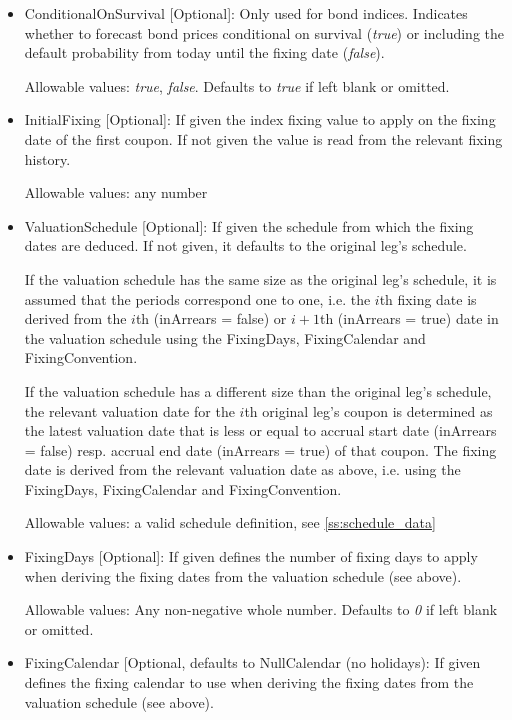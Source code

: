 \begin{itemize}
\begin{itemize}
\item ConditionalOnSurvival [Optional]: Only used for bond indices. Indicates whether to forecast bond
  prices conditional on survival (\emph{true}) or including the default probability from today until the fixing date (\emph{false}).

  Allowable values: \emph{true}, \emph{false}. Defaults to \emph{true} if left blank or omitted. 

\item InitialFixing [Optional]: If given the index fixing value to apply on the fixing date of the first coupon. If not
  given the value is read from the relevant fixing history.

  Allowable values: any number

\item ValuationSchedule [Optional]: If given the schedule from which the fixing dates are deduced. If not given, it
  defaults to the original leg's schedule.

  If the valuation schedule has the same size as the original leg's schedule,
  it is assumed that the periods correspond one to one, i.e. the $i$th fixing date is derived from the $i$th (inArrears
  = false) or $i+1$th (inArrears = true) date in the valuation schedule using the FixingDays, FixingCalendar and
  FixingConvention.

  If the valuation schedule has a different size than the original leg's schedule, the relevant valuation date for the
  $i$th original leg's coupon is determined as the latest valuation date that is less or equal to accrual start date
  (inArrears = false) resp. accrual end date (inArrears = true) of that coupon. The fixing date is derived from the
  relevant valuation date as above, i.e. using the FixingDays, FixingCalendar and FixingConvention.

  Allowable values: a valid schedule definition, see \ref{ss:schedule_data}

\item FixingDays [Optional]: If given defines the number of fixing days to apply when deriving the fixing
  dates from the valuation schedule (see above).

  Allowable values: Any non-negative whole number. Defaults to \emph{0} if left blank or omitted. 

\item FixingCalendar [Optional, defaults to NullCalendar (no holidays): If given defines the fixing calendar to use when
  deriving the fixing dates from the valuation schedule (see above).


\end{itemize}
\end{itemize}
